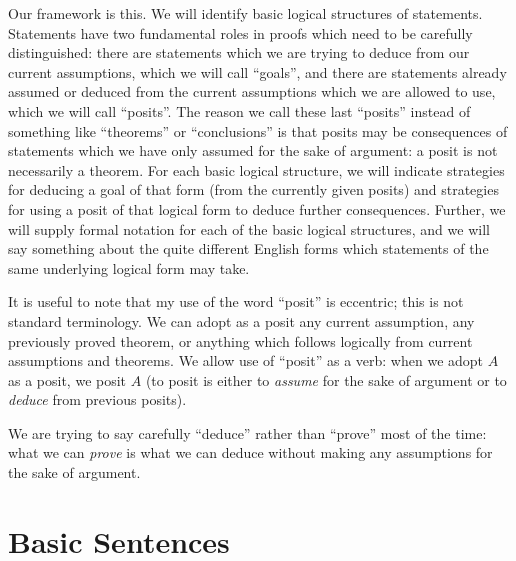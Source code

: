 \documentclass[12pt]{book}
\begin{document}
Our framework is this.  We will identify basic logical structures of
statements.  Statements have two fundamental roles in proofs which
need to be carefully distinguished: there are statements which we are
trying to deduce from our current assumptions, which we will call
``goals'', and there are statements already assumed or deduced from
the current assumptions which we are allowed to use, which we will
call ``posits''.  The reason we call these last ``posits'' instead of
something like ``theorems'' or ``conclusions'' is that posits may be
consequences of statements which we have only assumed for the sake of
argument: a posit is not necessarily a theorem.  For each basic
logical structure, we will indicate strategies for deducing a goal of
that form (from the currently given posits) and strategies for using a
posit of that logical form to deduce further consequences.  Further,
we will supply formal notation for each of the basic logical
structures, and we will say something about the quite different
English forms which statements of the same underlying logical form may
take.

It is useful to note that my use of the word ``posit'' is eccentric;
this is not standard terminology.  We can adopt as a posit any current
assumption, any previously proved theorem, or anything which follows
logically from current assumptions and theorems.  We allow use of
``posit'' as a verb: when we adopt $A$ as a posit, we posit $A$ (to
posit is either to {\em assume\/} for the sake of argument or to
{\em deduce\/} from previous posits).

We are trying to say carefully ``deduce'' rather than ``prove'' most
of the time: what we can {\em prove\/} is what we can deduce without
making any assumptions for the sake of argument.

\section{Basic Sentences}
\end{document}
